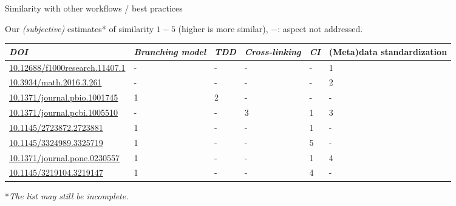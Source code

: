 \documentclass[
	aspectratio=169,%
	color={accentcolor=2d},
	logo=true,%
	colorframetitle=true,%
	]{tudabeamer}
\begin{document}
\begin{frame}{Similarity with other workflows / best practices}

	\vfill
	Our \emph{(subjective)} estimates* of similarity $1-5$ (higher is more similar), $-$: aspect not addressed.
	\begin{center}
		\scriptsize
		\begin{tabular}{@{} *6l @{}}    \toprule
				\emph{DOI} & \emph{Branching model} & \emph{TDD} & \emph{Cross-linking} & \emph{CI}  & (Meta)data standardization \\\midrule
				 \href{https://doi.org/10.12688/f1000research.11407.1}{10.12688/f1000research.11407.1} 
					 & -  & -  & -  & - & 1  \\ 
				 \href{https://doi.org/10.3934/math.2016.3.261}{10.3934/math.2016.3.261} 
					 & -  & -  & -  & - & 2  \\ 
				 \href{https://doi.org/10.1371/journal.pbio.1001745}{10.1371/journal.pbio.1001745} 
					 & 1  & 2  & -  & - & -  \\ 
				 \href{https://doi.org/10.1371/journal.pcbi.1005510}{10.1371/journal.pcbi.1005510}
					 & -  & -  & 3 & 1 & 3  \\ 
				 \href{https://doi.org/10.1145/2723872.2723881}{10.1145/2723872.2723881}
					 & 1  & -  & - & 1 & -  \\ 
				 \href{https://dl.acm.org/doi/10.1145/3324989.3325719}{10.1145/3324989.3325719}
					 & 1  & -  & - & 5 & -  \\ 
				 \href{https://doi.org/10.1371/journal.pone.0230557}{10.1371/journal.pone.0230557}
					 & 1  & -  & - & 1 & 4  \\ 
				 \href{https://doi.org/10.1145/3219104.3219147}{10.1145/3219104.3219147} 
					 & 1  & -  & -  & 4 & - \\\bottomrule
				 \hline
		\end{tabular}
	\end{center}
	
	*\emph{The list may still be incomplete.}
	
\end{frame}
\end{document}
